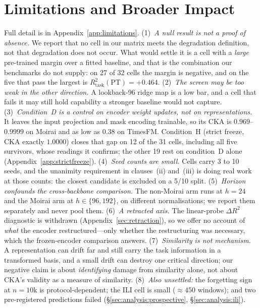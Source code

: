 \section{Limitations and Broader Impact}
\label{sec:limitations}

Full detail is in Appendix~\ref{app:limitations}.
(1)~\emph{A null result is not a proof of absence.} We report that no cell in
our matrix meets the degradation definition, not that degradation does not
occur.  What would settle it is a cell with a \emph{large} pre-trained margin
over a fitted baseline, and that is the combination our benchmarks do not
supply: on 27 of 32 cells the margin is negative, and on the five that pass
the largest is $R^2_\text{task}(\text{PT}){=}{+}0.464$.
(2)~\emph{The screen may be too weak in the other direction.} A lookback-96
ridge map is a low bar, and a cell that fails it may still hold capability a
stronger baseline would not capture.
(3)~\emph{Condition~D is a control on encoder weight updates, not on
representations.} It leaves the input projection and mask encoding trainable,
so its CKA is $0.969$--$0.9999$ on Moirai and as low as $0.38$ on TimesFM.
Condition~H (strict freeze, CKA exactly $1.0000$) closes that gap on 12 of the
31 cells, including all five survivors, whose readings it confirms; the other
19 rest on condition~D alone (Appendix~\ref{app:strictfreeze}).
(4)~\emph{Seed counts are small.} Cells carry 3 to 10 seeds, and the unanimity
requirement in clauses~(ii) and~(iii) is doing real work at those counts: the
closest candidate is excluded on a 5/10 split.
(5)~\emph{Horizon confounds the cross-backbone comparison.} The non-Moirai arm
runs at $h{=}24$ and the Moirai arm at $h{\in}\{96,192\}$, on different
normalisations; we report them separately and never pool them.
(6)~\emph{A retracted axis.} The linear-probe $\Delta R^2$ diagnostic is
withdrawn (Appendix~\ref{sec:retraction}), so we offer no account of \emph{what} the
encoder restructured---only whether the restructuring was necessary, which the
frozen-encoder comparison answers.
(7)~\emph{Similarity is not mechanism.} A representation can drift far and still
carry the task information in a transformed basis, and a small drift can destroy
one critical direction; our negative claim is about \emph{identifying} damage
from similarity alone, not about CKA's validity as a measure of similarity.
(8)~\emph{Also unsettled:} the forgetting sign at $n{=}10$k is
protocol-dependent; the ILI cell is small (${\approx}450$ windows); and two
pre-registered predictions failed (\S\ref{sec:analysis:prospective},
\S\ref{sec:analysis:ili}).

